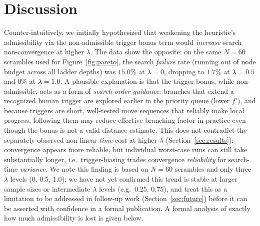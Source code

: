 \documentclass[10pt,conference]{article}
\begin{document}
\section{Discussion}
\label{sec:discussion}
Counter-intuitively, we initially hypothesized that weakening the
heuristic's admissibility via the non-admissible trigger bonus term
would \emph{increase} search non-convergence at higher $\lambda$.
The data show the opposite: on the same $N=60$ scrambles used for
Figure~\ref{fig:pareto}, the search \emph{failure} rate (running out
of node budget across all ladder depths) was $15.0\%$ at
$\lambda=0$, dropping to $1.7\%$ at $\lambda=0.5$ and $0\%$ at
$\lambda=1.0$. A plausible explanation is that the trigger bonus,
while non-admissible, acts as a form of \emph{search-order
guidance}: branches that extend a recognized human trigger are
explored earlier in the priority queue (lower $f'$), and because
triggers are short, well-tested move sequences that reliably make
local progress, following them may reduce effective branching factor
in practice even though the bonus is not a valid distance estimate.
This does not contradict the separately-observed non-linear
\emph{time} cost at higher $\lambda$ (Section~\ref{sec:results}):
convergence appears more reliable, but individual worst-case runs
can still take substantially longer, i.e.\ trigger-biasing trades
convergence \emph{reliability} for search-time \emph{variance}.
We note this finding is based on $N=60$ scrambles and only three
$\lambda$ levels (0, 0.5, 1.0); we have not yet confirmed this trend
is stable at larger sample sizes or intermediate $\lambda$ levels
(e.g.\ 0.25, 0.75), and treat this as a limitation to be addressed in
follow-up work (Section~\ref{sec:future}) before it can be asserted
with confidence in a formal publication. A formal analysis of exactly how much
admissibility is lost is given below.
\end{document}
